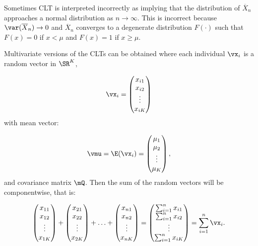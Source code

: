 \begin{remark}
  Sometimes CLT is interpreted incorrectly as implying that the distribution of $\overline{X}_n$ approaches a normal distribution as $n\to \infty$. This is incorrect because $\var(\overline{X}_n)\to 0$ and $\overline{X}_n$ converges to a degenerate distribution $F(\cdot)$ such that $F(x) = 0$ if $x < \mu$ and $F(x) = 1$ if $x\geq \mu$.
\end{remark}

Multivariate versions of the CLTs can be obtained where each individual $\vx_i$ is a random vector in $\SR^K$, 


\begin{equation*}
\vx_i =\begin{pmatrix}
        x_{i1}\\
        x_{i2} \\
        \vdots\\
        x_{iK}
      \end{pmatrix}  
\end{equation*}
%
with mean vector:

\begin{equation*}
\vmu = \E(\vx_i) = \begin{pmatrix}
          \mu_1 \\
          \mu_2 \\
          \vdots \\
          \mu_K
       \end{pmatrix},
\end{equation*}
%
and covariance matrix $\mQ$. Then the sum of the random vectors will be componentwise, that is:

\begin{equation*}
\begin{pmatrix}
        x_{11}\\
        x_{12} \\
        \vdots\\
        x_{1K}
      \end{pmatrix} +
\begin{pmatrix}
        x_{21}\\
        x_{22} \\
        \vdots\\
        x_{2K}
      \end{pmatrix}+
\hdots +
\begin{pmatrix}
        x_{n1}\\
        x_{n2} \\
        \vdots\\
        x_{nK}
      \end{pmatrix} =
\begin{pmatrix}
\sum_{i = 1}^n x_{i1} \\
\sum_{i = 1}^n x_{i2} \\
\vdots \\
\sum_{i = 1}^n x_{iK}
\end{pmatrix}=
\sum_{i = 1}^n\vx_i.
\end{equation*}

